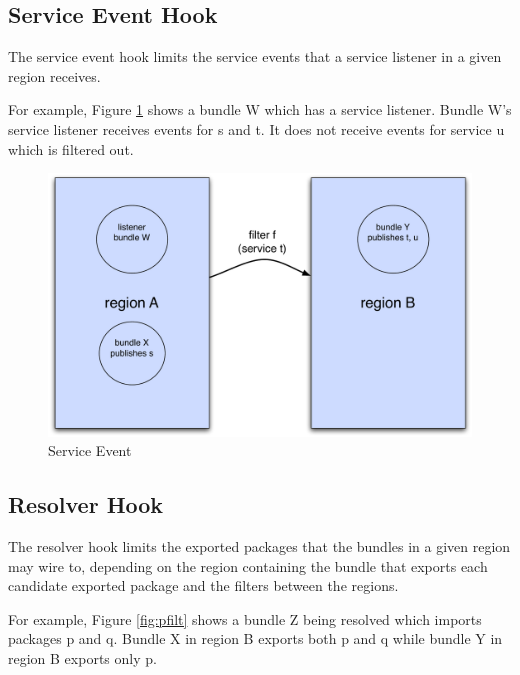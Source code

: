 \documentclass[a4paper,9pt]{article}
\begin{document}
\subsection{Service Event Hook}

The service event hook limits the service events that a service listener in a given region receives.

For example, Figure \ref{fig:sevent} shows a bundle W which has a service listener.
Bundle W's service listener receives events for s and t. It does not receive events for service u which is filtered out. 
\begin{figure}[h!]
\begin{center}
\includegraphics*[scale=0.4]{service-event.pdf}
\caption{Service Event \label{fig:sevent}}
\end{center}
\end{figure}

\subsection{Resolver Hook}

The resolver hook limits the exported packages that the bundles in a given region may wire to, depending on
the region containing the bundle that exports each candidate exported package and the filters between the
regions.

For example, Figure \ref{fig:pfilt} shows a bundle Z being resolved which imports packages p and q. Bundle X
in region B exports both p and q while bundle Y in region B exports only p.
\end{document}
